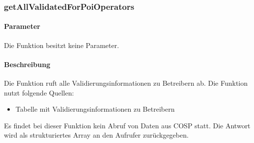 \subsubsection{getAllValidatedForPoiOperators}
\paragraph{Parameter} Die Funktion besitzt keine Parameter.
\paragraph{Beschreibung} Die Funktion ruft alle Validierungsinformationen zu Betreibern ab. Die Funktion nutzt folgende Quellen:
\begin{itemize}
	\item Tabelle mit Validierungsinformationen zu Betreibern
\end{itemize}
Es findet bei dieser Funktion kein Abruf von Daten aus {\glqq COSP\grqq} statt. Die Antwort wird als strukturiertes Array an den Aufrufer zurückgegeben.